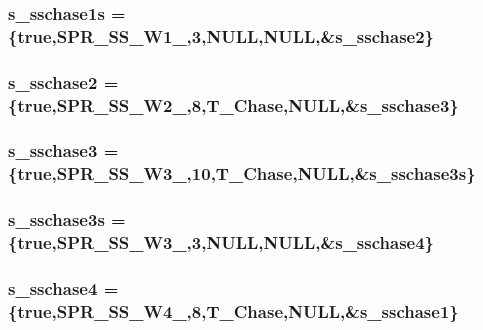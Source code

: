 \label{WL__ACT2_8C_ae0f8e756abc0877ae24d5fd8e3b88bea}
\hypertarget{WL__ACT2_8C_ae5a320f2d0fccd1596848af02f403dd3}{
\subsubsection[{s\_\-sschase1s}]{ {\bf s\_\-sschase1s} = \{true,SPR\_\-SS\_\-W1\_,3,NULL,NULL,\&{\bf s\_\-sschase2}\}}}
\label{WL__ACT2_8C_ae5a320f2d0fccd1596848af02f403dd3}
\hypertarget{WL__ACT2_8C_a2a840ea76500e2b74c673759a7f78d8a}{
\subsubsection[{s\_\-sschase2}]{ {\bf s\_\-sschase2} = \{true,SPR\_\-SS\_\-W2\_,8,T\_\-Chase,NULL,\&{\bf s\_\-sschase3}\}}}
\label{WL__ACT2_8C_a2a840ea76500e2b74c673759a7f78d8a}
\hypertarget{WL__ACT2_8C_a129bdfee154d0007b9520b02ba5b83a5}{
\subsubsection[{s\_\-sschase3}]{ {\bf s\_\-sschase3} = \{true,SPR\_\-SS\_\-W3\_,10,T\_\-Chase,NULL,\&{\bf s\_\-sschase3s}\}}}
\label{WL__ACT2_8C_a129bdfee154d0007b9520b02ba5b83a5}
\hypertarget{WL__ACT2_8C_a728f42d89af0217931bfc3f834bdf06d}{
\subsubsection[{s\_\-sschase3s}]{ {\bf s\_\-sschase3s} = \{true,SPR\_\-SS\_\-W3\_,3,NULL,NULL,\&{\bf s\_\-sschase4}\}}}
\label{WL__ACT2_8C_a728f42d89af0217931bfc3f834bdf06d}
\hypertarget{WL__ACT2_8C_a21f06af6990617be09e45eb957e3ce55}{
\subsubsection[{s\_\-sschase4}]{ {\bf s\_\-sschase4} = \{true,SPR\_\-SS\_\-W4\_,8,T\_\-Chase,NULL,\&{\bf s\_\-sschase1}\}}}
